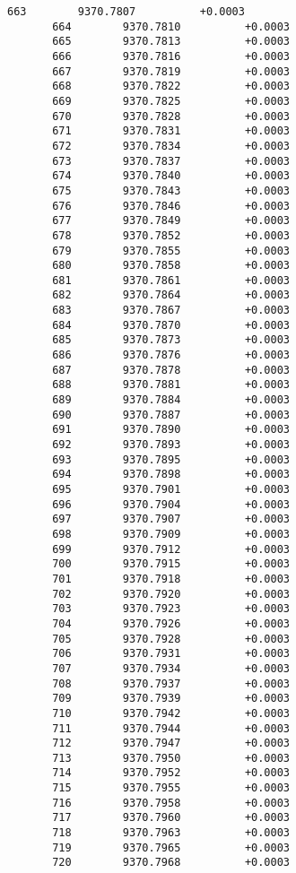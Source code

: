 \documentclass[11pt]{article}
\begin{document}
\begin{Verbatim}[commandchars=\\\{\}]
       663        9370.7807          +0.0003
       664        9370.7810          +0.0003
       665        9370.7813          +0.0003
       666        9370.7816          +0.0003
       667        9370.7819          +0.0003
       668        9370.7822          +0.0003
       669        9370.7825          +0.0003
       670        9370.7828          +0.0003
       671        9370.7831          +0.0003
       672        9370.7834          +0.0003
       673        9370.7837          +0.0003
       674        9370.7840          +0.0003
       675        9370.7843          +0.0003
       676        9370.7846          +0.0003
       677        9370.7849          +0.0003
       678        9370.7852          +0.0003
       679        9370.7855          +0.0003
       680        9370.7858          +0.0003
       681        9370.7861          +0.0003
       682        9370.7864          +0.0003
       683        9370.7867          +0.0003
       684        9370.7870          +0.0003
       685        9370.7873          +0.0003
       686        9370.7876          +0.0003
       687        9370.7878          +0.0003
       688        9370.7881          +0.0003
       689        9370.7884          +0.0003
       690        9370.7887          +0.0003
       691        9370.7890          +0.0003
       692        9370.7893          +0.0003
       693        9370.7895          +0.0003
       694        9370.7898          +0.0003
       695        9370.7901          +0.0003
       696        9370.7904          +0.0003
       697        9370.7907          +0.0003
       698        9370.7909          +0.0003
       699        9370.7912          +0.0003
       700        9370.7915          +0.0003
       701        9370.7918          +0.0003
       702        9370.7920          +0.0003
       703        9370.7923          +0.0003
       704        9370.7926          +0.0003
       705        9370.7928          +0.0003
       706        9370.7931          +0.0003
       707        9370.7934          +0.0003
       708        9370.7937          +0.0003
       709        9370.7939          +0.0003
       710        9370.7942          +0.0003
       711        9370.7944          +0.0003
       712        9370.7947          +0.0003
       713        9370.7950          +0.0003
       714        9370.7952          +0.0003
       715        9370.7955          +0.0003
       716        9370.7958          +0.0003
       717        9370.7960          +0.0003
       718        9370.7963          +0.0003
       719        9370.7965          +0.0003
       720        9370.7968          +0.0003

\end{Verbatim}
\end{document}
